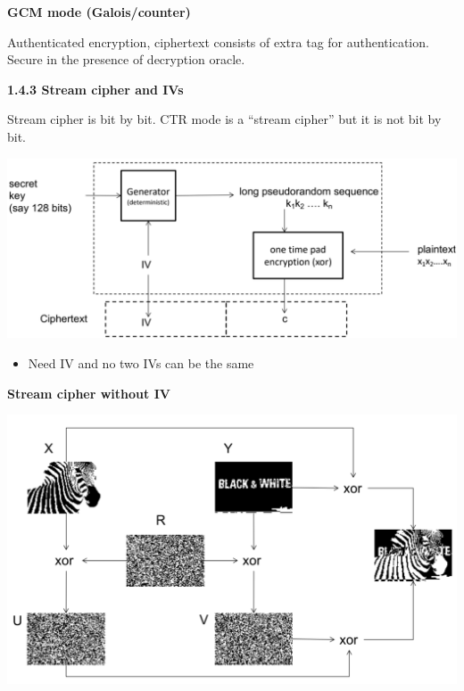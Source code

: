 \documentclass[landscape,a4paper]{extarticle}
\newenvironment{Figure}
  {\par\noindent\minipage{\linewidth}}
  {\endminipage\par\medskip}
\begin{document}
\begin{multicols*}{5}
    \textbf{GCM mode (Galois/counter)}

    Authenticated encryption, ciphertext consists of extra tag for authentication.
    Secure in the presence of decryption oracle.

    \textbf{1.4.3 Stream cipher and IVs}

    Stream cipher is bit by bit. CTR mode is a ``stream cipher'' but it is not bit by bit.
    \begin{Figure}
        \centering
        \includegraphics[width=\linewidth]{stream_cipher.png}        
    \end{Figure}

    \begin{itemize}
        \item Need IV and no two IVs can be the same
    \end{itemize}

    \textbf{Stream cipher without IV}
    \begin{Figure}
        \centering
        \includegraphics[width=\linewidth]{stream_cipher_without_iv.png}        
    \end{Figure}


\end{multicols*}
\end{document}
